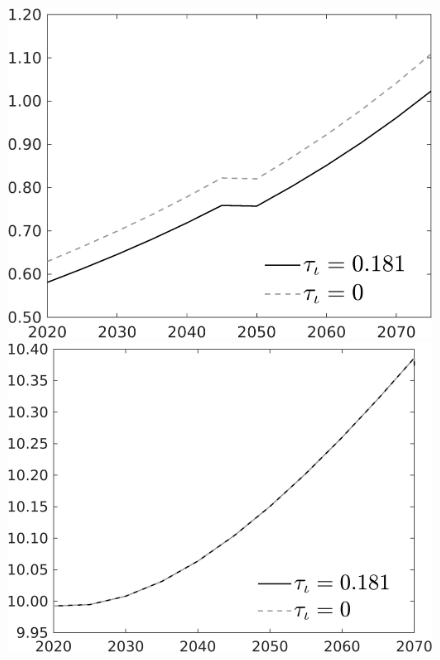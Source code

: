 \documentclass[12pt]{article}
\begin{document}
\begin{figure}[h!!]
\begin{minipage}[]{0.32\textwidth}
	\end{minipage}	
	\begin{minipage}[]{0.32\textwidth}
		\includegraphics[width=1\textwidth]{../../codding_model/own_basedOnFried/optimalPol_010922_revision/figures/all_13Sept22/CompTauf_bytaul_Reg0_C_spillover0_nsk0_xgr1_knspil0_sep1_LFlimit1_emsbase0_countec0_GovRev0_etaa0.79_lgd1.png}
	\end{minipage}	
	\begin{minipage}[]{0.32\textwidth}
		\includegraphics[width=1\textwidth]{../../codding_model/own_basedOnFried/optimalPol_010922_revision/figures/all_13Sept22/CompTauf_bytaul_Reg0_gAf_spillover0_nsk0_xgr1_knspil0_sep1_LFlimit1_emsbase0_countec0_GovRev0_etaa0.79_lgd1.png}

\end{minipage}
\end{figure}
\end{document}
